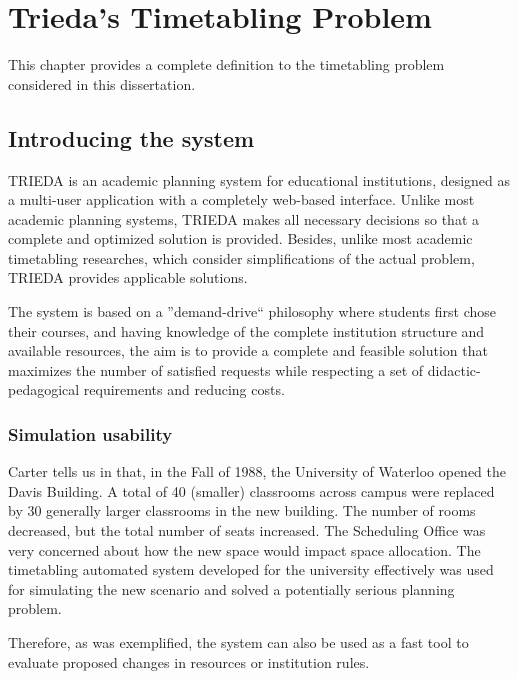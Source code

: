 \chapter{Trieda's Timetabling Problem}
\label{chap:timetabling}


This chapter provides a complete definition to the timetabling problem considered in this dissertation.



\section{Introducing the system}
\label{sec:system}


TRIEDA is an academic planning system for educational institutions, designed as a multi-user application with a completely web-based interface. Unlike most academic planning systems, TRIEDA makes all necessary decisions so that a complete and optimized solution is provided. Besides, unlike most academic timetabling researches, which consider simplifications of the actual problem, TRIEDA provides applicable solutions.

The system is based on a ''demand-drive`` philosophy where students first chose their courses, and having knowledge of the complete institution structure and available resources, the aim is to provide a complete and feasible solution that maximizes the number of satisfied requests while respecting a set of didactic-pedagogical requirements and reducing costs.


\subsection{Simulation usability}
\label{subsec:simulation}

Carter tells us in \cite{Carter2001} that, in the Fall of 1988, the University of Waterloo opened the Davis Building. A total of 40 (smaller) classrooms across campus were replaced by 30 generally larger classrooms in the new building. The number of rooms decreased, but the total number of seats increased. The Scheduling Office was very concerned about how the new space would impact space allocation. The timetabling automated system developed for the university effectively was used for simulating the new scenario and solved a potentially serious planning problem.

Therefore, as was exemplified, the system can also be used as a fast  tool to evaluate proposed changes in resources or institution rules.


